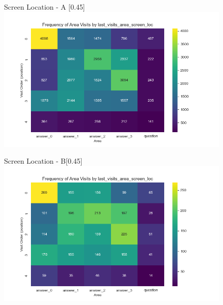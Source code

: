 \documentclass{article}
\begin{document}
\begin{figure}[H]
  \centering
  \begin{subcaptionbox}{Screen Location - A \label{fig:sl_a}}[0.45\textwidth]
    {\centering\includegraphics[width=\linewidth]{plots/visits/matrix_first_visits_last_visits_area_screen_loc_gatherers_A (hunters).png}}
  \end{subcaptionbox}
  \hfill
  \begin{subcaptionbox}{Screen Location - B\label{fig:sl_b}}[0.45\textwidth]
    {\centering\includegraphics[width=\linewidth]{plots/visits/matrix_first_visits_last_visits_area_screen_loc_gatherers_B (hunters).png}}
  \end{subcaptionbox}
  
  \vspace{1em} %


\end{figure}
\end{document}
